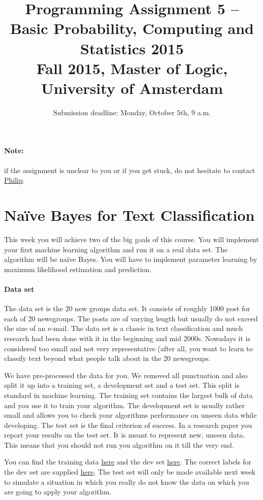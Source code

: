 \documentclass[11pt, leqno, a4paper]{article}
\title{Programming Assignment 5 -- Basic Probability, Computing and Statistics 2015 \\[2mm]
\large{Fall 2015, Master of Logic, University of Amsterdam}}
\author{}
\date{Submission deadline: Monday, October 5th, 9 a.m.}
\begin{document}
\maketitle

\paragraph{Note:} if the assignment is unclear to you or if you get stuck, do not hesitate to contact \href{mailto:P.Schulz@uva.nl}{Philip}.

\section{Na\"ive Bayes for Text Classification}

This week you will achieve two of the big goals of this course. You will implement your first machine 
learning algorithm and run it on a real data set. The algorithm will be na\"ive Bayes. You will have to 
implement parameter learning by maximum likelihood estimation and prediction.

\paragraph{Data set} The data set is the 20 new groups data set. It consists of roughly 1000 post for each
of 20 newsgroups. The posts are of varying length but usually do not exceed the size of an e-mail. The
data set is a classic in text classification and much research had been done with it in the beginning and
mid 2000s. Nowadays it is considered too small and not very representative (after all, you want to learn
to classify text beyond what people talk about in the 20 newsgroups.

We have pre-processed the data for you. We removed all punctuation and also split it up into a training
set, a development set and a test set. This split is standard in machine learning. The training set contains
the largest bulk of data and you use it to train your algorithm. The development set is usually rather
small and allows you to check your algorithms performance on unseen data while developing. The test set
is the final criterion of success. In a research paper you report your results on the test set. It is meant
to represent new, unseen data. This means that you should not run you algorithm on it till the very end.

You can find the training data \href{https://github.com/BasicProbability/BasicProbability.github.io/blob/master/Homework/Programming/Assignment5/20news-18828.zip}{here} and the dev set \href{https://github.com/BasicProbability/BasicProbability.github.io/blob/master/Homework/Programming/Assignment5/20news-18828.zip}{here}. The correct labels for the dev set are supplied \href{https://github.com/BasicProbability/BasicProbability.github.io/blob/master/Homework/Programming/Assignment5/correct_dev_labels.txt}{here}.
The test set will only be made available next week
to simulate a situation in which you really do not know the data on which you are going to apply your 
algorithm.
\end{document}
